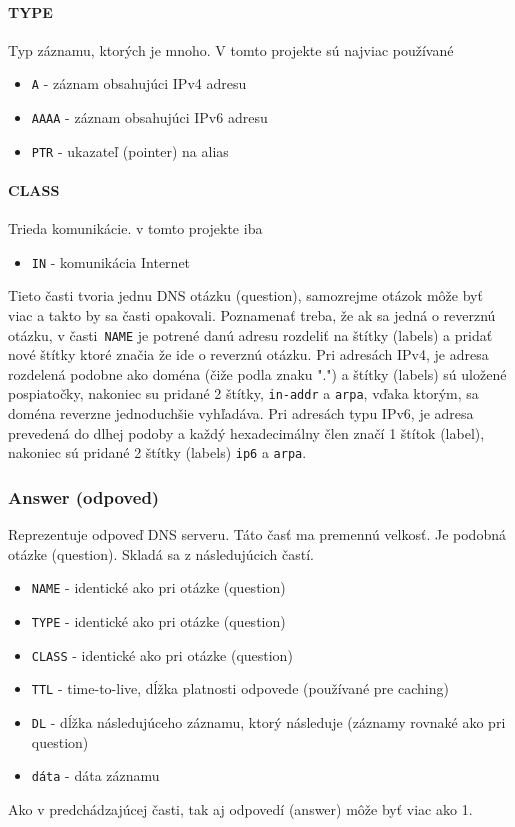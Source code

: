 \documentclass[titlepage]{article}
\begin{document}
\paragraph{TYPE}
Typ záznamu, ktorých je mnoho. V tomto projekte sú najviac používané
\begin{itemize}
    \item \verb|A| - záznam obsahujúci IPv4 adresu
    \item \verb|AAAA| - záznam obsahujúci IPv6 adresu
    \item \verb|PTR| - ukazateľ (pointer) na alias
\end{itemize}

\paragraph{CLASS}
Trieda komunikácie. v tomto projekte iba
\begin{itemize}
   \item \verb|IN| - komunikácia Internet
\end{itemize}
Tieto časti tvoria jednu DNS otázku (question), samozrejme otázok môže byť viac
a takto by sa časti opakovali.
Poznamenať treba, že ak sa jedná o reverznú otázku, v časti \verb|NAME| je potrené
danú adresu rozdeliť na štítky (labels) a pridať nové štítky ktoré značia že ide o reverznú
otázku. Pri adresách IPv4, je adresa rozdelená podobne ako doména (čiže podla znaku ".") a štítky 
(labels) sú uložené pospiatočky, nakoniec su pridané 2 štítky, \verb|in-addr| a \verb|arpa|, vďaka ktorým,
sa doména reverzne jednoduchšie vyhľadáva. Pri adresách typu IPv6, je adresa prevedená do dlhej podoby a
každý hexadecimálny člen značí 1 štítok (label), nakoniec sú pridané 2 štítky (labels) \verb|ip6| a \verb|arpa|.

\subsubsection{Answer (odpoved)}
Reprezentuje odpoveď DNS serveru.
Táto časť ma premennú velkosť. Je podobná otázke (question).
Skladá sa z následujúcich častí.

\begin{itemize}
    \item \verb|NAME| - identické ako pri otázke (question)
    \item \verb|TYPE| - identické ako pri otázke (question)
    \item \verb|CLASS| - identické ako pri otázke (question)
    \item \verb|TTL| - time-to-live, dĺžka platnosti odpovede (používané pre caching)
    \item \verb|DL| - dĺžka následujúceho záznamu, ktorý následuje (záznamy rovnaké ako pri question)
    \item \verb|dáta| - dáta záznamu
\end{itemize}
Ako v predchádzajúcej časti, tak aj odpovedí (answer) môže byť viac ako 1. 
\end{document}
